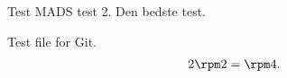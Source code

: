 \documentclass[11pt,a4paper,twoside,openany,final]{memoir}
\theoremstyle{break}
\theoremstyle{Break}
\begin{document}
Test MADS test 2. Den bedste test. 

Test file for Git. 
\begin{align*}
2 \rpm 2 = \rpm 4. 
\end{align*}
\end{document}
